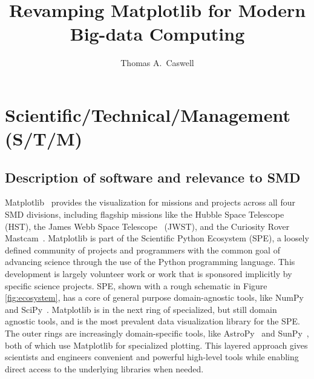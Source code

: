 \documentclass[12pt]{article}
\numberwithin{page}{section}
\begin{document}
\title{Revamping Matplotlib for Modern Big-data Computing}
\author{Thomas A.\ Caswell}
\date{}
\maketitle

\setcounter{tocdepth}{2}
\tableofcontents
\thispagestyle{empty}
\newpage

\section{Scientific/Technical/Management (S/T/M)}
\setcounter{page}{1}

\subsection{Description of software and relevance to SMD}

Matplotlib~\cite{Hunter:2007} provides the visualization for  missions and
projects across all four SMD divisions,
including
flagship missions like the Hubble Space Telescope (HST), the James Webb Space
Telescope~\cite{jwst_pipeline} (JWST), and the Curiosity Rover
Mastcam~\cite{https://doi.org/10.1002/2016EA000219}.  Matplotlib is part of the
Scientific
Python Ecosystem (SPE), a loosely defined community of projects and
programmers with the common goal of advancing science through the use
of the Python programming language.  This development is largely
volunteer work or work that is sponsored implicitly by specific
science projects.  SPE, shown with a rough schematic in Figure
\ref{fig:ecosystem}, has a core of general purpose domain-agnostic
tools, like NumPy~\cite{Harris2020} and SciPy~\cite{Virtanen2020}. Matplotlib
is in the next ring of specialized, but still domain agnostic tools, and is the
most prevalent data visualization
library for the SPE.  The outer rings are increasingly domain-specific tools,
like
AstroPy~\cite{robitaille2013astropy} and
SunPy~\cite{sunpy_community2020}, both of which use Matplotlib for specialized
plotting.  This layered approach gives
scientists and engineers convenient and powerful high-level tools
while enabling direct access to the underlying libraries when needed.
\end{document}

